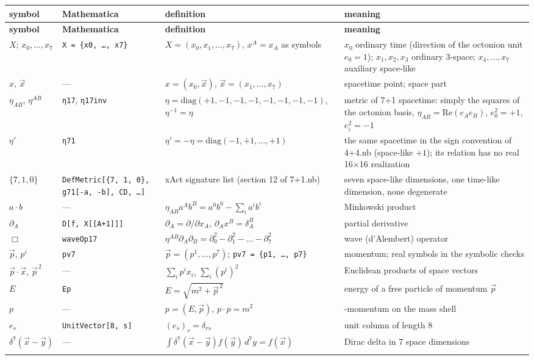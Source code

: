 \documentclass[10pt,a4paper]{article}
\begin{document}
{\small
\begin{longtable}{>{\raggedright\arraybackslash}p{}>{\raggedright\arraybackslash}p{}>{\raggedright\arraybackslash}p{}>{\raggedright\arraybackslash}p{}}
\toprule
\textbf{symbol} & \textbf{Mathematica} & \textbf{definition} & \textbf{meaning} \\
\midrule\endfirsthead
\toprule
\textbf{symbol} & \textbf{Mathematica} & \textbf{definition} & \textbf{meaning} \\
\midrule\endhead
\endfoot
\bottomrule\endlastfoot
$X$; $x_0,\dots,x_7$ & \texttt{X = \{x0, …, x7\}} & $X=(x_0,x_1,\dots,x_7)$, $x^A=x_A$ as symbols & $x_0$ ordinary time (direction of the octonion unit $e_0=1$); $x_1,x_2,x_3$ ordinary 3-space; $x_4,\dots,x_7$ auxiliary space-like \\
$x$, $\vec x$ & — & $x=(x_0,\vec x)$, $\vec x=(x_1,\dots,x_7)$ & spacetime point; space part \\
$\eta_{AB}$, $\eta^{AB}$ & \texttt{η17}, \texttt{η17inv} & $\eta=\mathrm{diag}(+1,-1,-1,-1,-1,-1,-1,-1)$, $\eta^{-1}=\eta$ & metric of 7+1 spacetime: simply the squares of the octonion basis, $\eta_{AB}=\mathrm{Re}(e_Ae_B)$, $e_0^2=+1$, $e_i^2=-1$ \\
$\eta'$ & \texttt{η71} & $\eta'=-\eta=\mathrm{diag}(-1,+1,\dots,+1)$ & the same spacetime in the sign convention of 4+4.nb (space-like $+1$); its relation has no real 16×16 realization \\
$\{7,1,0\}$ & \texttt{DefMetric[\{7, 1, 0\}, g71[-a, -b], CD, …]} & xAct signature list (section 12 of 7+1.nb) & seven space-like dimensions, one time-like dimension, none degenerate \\
$a\cdot b$ & — & $\eta_{AB}a^Ab^B=a^0b^0-\sum_ia^ib^i$ & Minkowski product \\
$\partial_A$ & \texttt{D[f, X[[A+1]]]} & $\partial_A=\partial/\partial x_A$, $\partial_Ax^B=\delta_A^B$ & partial derivative \\
$\Box$ & \texttt{waveOp17} & $\eta^{AB}\partial_A\partial_B=\partial_0^2-\partial_1^2-\dots-\partial_7^2$ & wave (d’Alembert) operator \\
$\vec p$, $p^i$ & \texttt{pv7} & $\vec p=(p^1,\dots,p^7)$; \texttt{pv7 = \{p1, …, p7\}} & momentum; real symbols in the symbolic checks \\
$\vec p\cdot\vec x$, $\vec p^{\,2}$ & — & $\sum_ip^ix_i$, $\sum_i(p^i)^2$ & Euclidean products of space vectors \\
$E$ & \texttt{Ep} & $E=\sqrt{m^2+\vec p^{\,2}}$ & energy of a free particle of momentum $\vec p$ \\
$p$ & — & $p=(E,\vec p)$, $p\cdot p=m^2$ & 8-momentum on the mass shell \\
$e_s$ & \texttt{UnitVector[8, s]} & $(e_s)_r=\delta_{rs}$ & unit column of length 8 \\
$\delta^7(\vec x-\vec y)$ & — & $\int\delta^7(\vec x-\vec y)f(\vec y)\,d^7y=f(\vec x)$ & Dirac delta in 7 space dimensions \\*
\end{longtable}}
\end{document}
